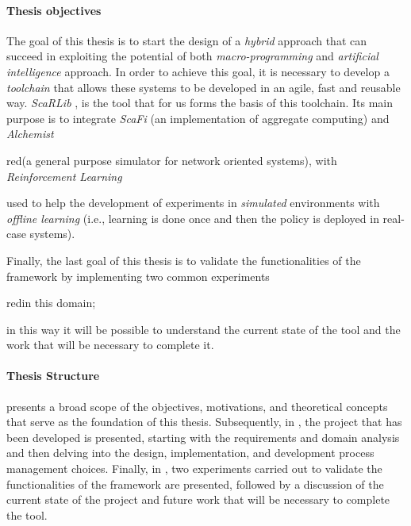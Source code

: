 \documentclass[12pt,a4paper,openright,twoside]{book}
\begin{document}
%
\paragraph{Thesis objectives}
The goal of this thesis is to start the design of a \emph{hybrid} approach
    that can succeed in exploiting the potential of both \emph{macro-programming} and \emph{artificial intelligence} approach.
    In order to achieve this goal, it is necessary to develop a \emph{toolchain} that allows these systems to be developed in an agile,
    fast and reusable way. 
    \emph{ScaRLib} \cite{scarlib}, is the tool that for us forms the basis of this toolchain.
    Its main purpose is to integrate \emph{ScaFi} \cite{casadei2022scafi} (an implementation of aggregate computing) 
    and \emph{Alchemist} \cite{pianini2013chemical} \begin{color}{red}(a general purpose simulator for network oriented systems), 
    with \emph{Reinforcement Learning} \end{color}used to help the development of experiments in \emph{simulated} environments with \emph{offline learning}
    (i.e., learning is done once and then the policy is deployed in real-case systems). 
    
Finally, the last goal of this thesis is to validate the functionalities of the framework by implementing 
    two common experiments \begin{color}{red}in this domain; \end{color}in this way it will be possible to understand the current state of the tool 
    and the work that will be necessary to complete it. 


%
\paragraph{Thesis Structure} 

 presents a broad scope of the objectives, motivations, and theoretical concepts that serve as the foundation 
    of this thesis. Subsequently, in , the project that has been developed is presented, starting with 
    the requirements and domain analysis and then delving into the design, implementation, and development process management choices. 
    Finally, in , two experiments carried out to validate the functionalities of the framework are presented,
    followed by a discussion of the current state of the project and future work that will be necessary to complete the tool.
\end{document}
